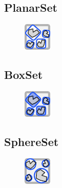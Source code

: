 \documentclass{ol-softwaremanual}
\begin{document}
\subsection{PlanarSet}
\begin{figure}[h]
    \centering
    \includegraphics[width = .5\textwidth]{figures/Icons/PLANARSET.pdf}
\end{figure}

\subsection{BoxSet}
\begin{figure}[h]
    \centering
    \includegraphics[width = .5\textwidth]{figures/Icons/BOXSET.pdf}
\end{figure}

\subsection{SphereSet}
\begin{figure}[h]
    \centering
    \includegraphics[width = .5\textwidth]{figures/Icons/SPHERESET.pdf}
\end{figure}
\end{document}
